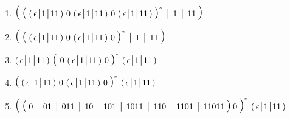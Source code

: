 \documentclass[11pt]{article}
\begin{document}
\begin{enumerate}
\begin{enumerate}
            \item \(
                    \Lpar \:
                      \lpar \: \stuff \ 0 \ \stuff \ 0 \ \stuff \: \rpar^* \
                      \mymid \ 1 \
                      \mymid \ 11 \:
                    \Rpar
                  \)

            \item \(
                    \Lpar \:
                      \lpar \: \stuff \ 0 \ \stuff \ 0 \: \rpar^* \
                      \mymid \ 1 \
                      \mymid \ 11 \:
                    \Rpar
                  \)

            \item \(
                    \stuff
                    \ \lpar \ 0 \ \stuff \ 0 \: \rpar^* \
                    \stuff
                  \)

            \item \(
                    \lpar \: \stuff \ 0 \ \stuff \ 0 \: \rpar^* \ \stuff
                  \)

            \item \(
                    \Lpar \:
                      \lpar \:
                        0 \ \mymid \ 01 \ \mymid \ 011 \ \mymid \
                        10 \ \mymid \ 101 \ \mymid \ 1011 \ \mymid \
                        110 \ \mymid \ 1101 \ \mymid \ 11011
                      \: \rpar \: 0 \:
                    \Rpar^* \
                    \stuff
                  \)

          \end{enumerate}

  \end{enumerate}
\end{document}
